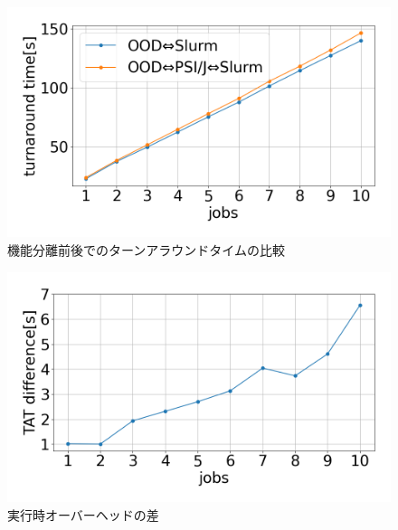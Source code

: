 
\begin{figure}[tb]
    \centering
    \includegraphics[width=120mm]{./fig/ave_1-20.png}
    \caption{機能分離前後でのターンアラウンドタイムの比較}
    \label{fig8}
\end{figure}
  
\begin{figure}[tb]
    \centering
    \includegraphics[width=120mm]{./fig/ave_diff_1-20.png}
    \caption{実行時オーバーヘッドの差}
    \label{fig9}
\end{figure}


